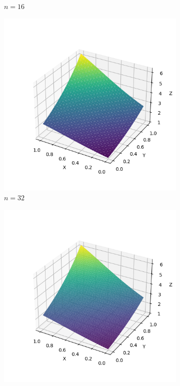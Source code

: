 \documentclass[lang=cn,a4paper,newtx,bibend=bibtex]{elegantpaper}
\begin{document}
\begin{figure}[H]
\begin{subfigure}[b]{0.18\textwidth}
      \caption{$n= 16$}
  \end{subfigure}
  \hfill
  \begin{subfigure}[b]{0.18\textwidth}
      \includegraphics[width=\textwidth]{../../res_bac/res-[data|1-Neumann-regular-c32].png}
      \caption{$n = 32$}
  \end{subfigure}
  \hfill
  \begin{subfigure}[b]{0.18\textwidth}
      \includegraphics[width=\textwidth]{../../res_bac/res-[data|1-Neumann-regular-d64].png}

\end{subfigure}
\end{figure}
\end{document}
